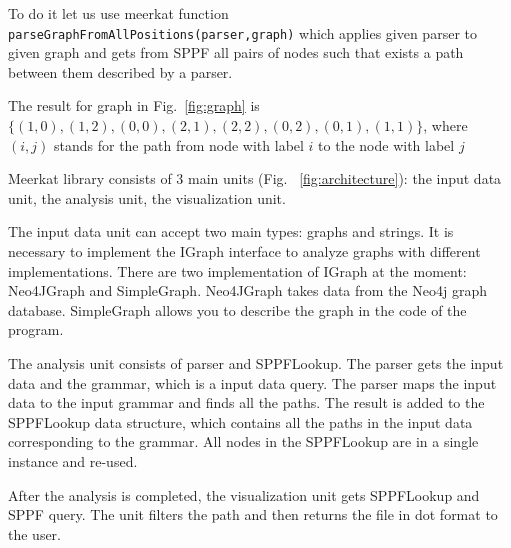 To do it let us use meerkat function \lstinline{parseGraphFromAllPositions(parser,graph)} which applies given parser to given graph and gets from SPPF all pairs of nodes such that exists a path between them described by a parser.

The result for graph in Fig.~\ref{fig:graph} is $\{(1,0), (1,2), (0,0), (2,1), (2,2), (0,2), (0,1), (1,1)\}$, where $(i,j)$ stands for the path from node with label $i$ to the node with label $j$

Meerkat library consists of 3 main units (Fig. ~\ref{fig:architecture}): the input data unit, the analysis unit, the visualization unit.

The input data unit can accept two main types: graphs and strings. It is necessary to implement the IGraph interface to analyze graphs with different implementations. There are two implementation of IGraph at the moment: Neo4JGraph and SimpleGraph. Neo4JGraph takes data from the Neo4j graph database. SimpleGraph allows you to describe the graph in the code of the program.

The analysis unit consists of parser and SPPFLookup. The parser gets the input data and the grammar, which is a input data query.  The parser maps the input data to the input grammar and finds all the paths. The result is added to the SPPFLookup data structure, which contains all the paths in the input data corresponding to the grammar. All nodes in the SPPFLookup are in a single instance and re-used.

After the analysis is completed, the visualization unit gets SPPFLookup and SPPF query. The unit filters the path and then returns the file in dot format to the user.




